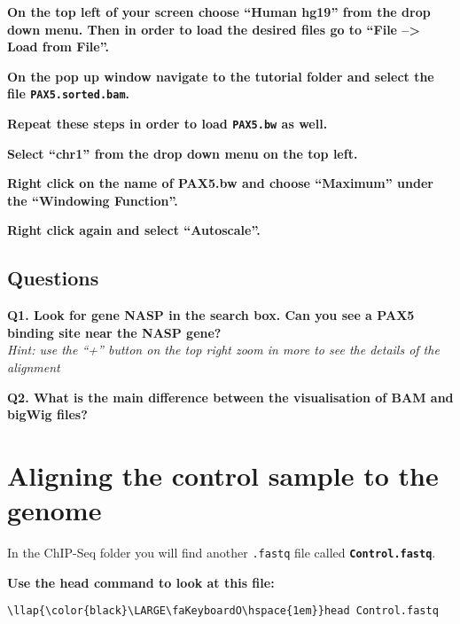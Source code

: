 \documentclass[11pt]{article}
\begin{document}
    \textbf{On the top left of your screen choose ``Human hg19'' from the
drop down menu. Then in order to load the desired files go to ``File
--\textgreater{} Load from File''.}

\textbf{On the pop up window navigate to the tutorial folder and select
the file \texttt{PAX5.sorted.bam}.}

\textbf{Repeat these steps in order to load \texttt{PAX5.bw} as well.}

\textbf{Select ``chr1'' from the drop down menu on the top left.}

\textbf{Right click on the name of PAX5.bw and choose ``Maximum'' under
the ``Windowing Function''.}

\textbf{Right click again and select ``Autoscale''.}

    \hypertarget{questions}{%
\subsection{Questions}\label{questions}}

\textbf{Q1. Look for gene NASP in the search box. Can you see a PAX5
binding site near the NASP gene?}\\
\textit{Hint: use the ``+'' button on the top right zoom in more to see
the details of the alignment}

\textbf{Q2. What is the main difference between the visualisation of BAM
and bigWig files?}




\newpage





    \hypertarget{aligning-the-control-sample-to-the-genome}{%
\section{Aligning the control sample to the
genome}\label{aligning-the-control-sample-to-the-genome}}

    In the ChIP-Seq folder you will find another \texttt{.fastq} file called
\textbf{\texttt{Control.fastq}}.

    \textbf{Use the head command to look at this file:}





\begin{terminalinput}
\begin{Verbatim}[commandchars=\\\{\}]
\llap{\color{black}\LARGE\faKeyboardO\hspace{1em}}head Control.fastq
\end{Verbatim}
\end{terminalinput}
\end{document}
